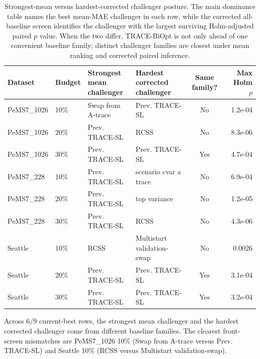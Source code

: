 \begin{table}[pos=htbp]
\centering
\caption{Strongest-mean versus hardest-corrected challenger posture. The main dominance table names the best mean-MAE challenger in each row, while the corrected all-baseline screen identifies the challenger with the largest surviving Holm-adjusted paired $p$ value. When the two differ, TRACE-BiOpt is not only ahead of one convenient baseline family; distinct challenger families are closest under mean ranking and corrected paired inference.}
\label{tab:trace-biopt-challenger-posture}
\small
\setlength{\tabcolsep}{4pt}
\begin{tabular}{ll>{\raggedright\arraybackslash}p{}>{\raggedright\arraybackslash}p{}cr}
\toprule
Dataset & Budget & \makecell[l]{Strongest mean\\challenger} & \makecell[l]{Hardest corrected\\challenger} & Same family? & Max Holm $p$ \\
\midrule
PeMS7\_1026 & 10\% & Swap from A-trace & Prev. TRACE-SL & No & 1.2e-04 \\
PeMS7\_1026 & 20\% & Prev. TRACE-SL & RCSS & No & 8.3e-06 \\
PeMS7\_1026 & 30\% & Prev. TRACE-SL & Prev. TRACE-SL & Yes & 4.7e-04 \\
PeMS7\_228 & 10\% & Prev. TRACE-SL & scenario cvar a trace & No & 6.9e-04 \\
PeMS7\_228 & 20\% & Prev. TRACE-SL & top variance & No & 1.2e-05 \\
PeMS7\_228 & 30\% & Prev. TRACE-SL & RCSS & No & 4.3e-06 \\
Seattle & 10\% & RCSS & Multistart validation-swap & No & 0.0026 \\
Seattle & 20\% & Prev. TRACE-SL & Prev. TRACE-SL & Yes & 3.1e-04 \\
Seattle & 30\% & Prev. TRACE-SL & Prev. TRACE-SL & Yes & 3.2e-04 \\
\bottomrule
\end{tabular}
\vspace{0.35em}
\parbox{0.96\textwidth}{\small Across 6/9 current-best rows, the strongest mean challenger and the hardest corrected challenger come from different baseline families. The clearest front-screen mismatches are PeMS7\_1026 10\% (Swap from A-trace versus Prev. TRACE-SL) and Seattle 10\% (RCSS versus Multistart validation-swap).}
\end{table}
